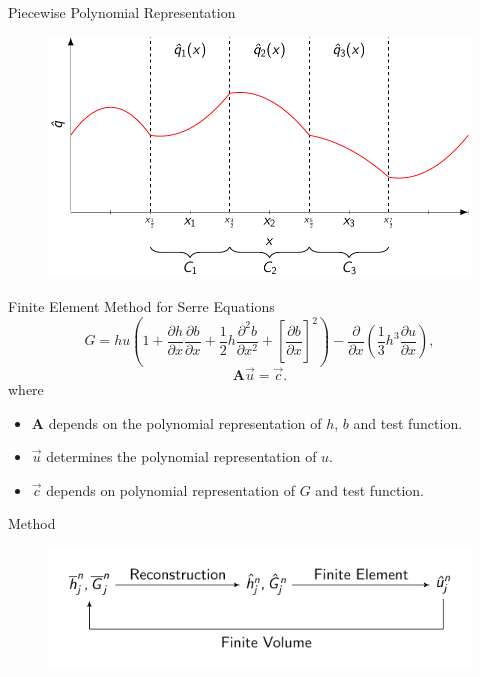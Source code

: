 \documentclass[]{beamer}
\begin{document}
\begin{frame}{Piecewise Polynomial Representation}
	\begin{figure}
		\includegraphics[width=\textwidth]{./Pics/PolyRep/P2.pdf}
	\end{figure}
\end{frame}


\begin{frame}{Finite Element Method for Serre Equations}
		\[ G =  h {u} \left(1 + \frac{\partial h}{\partial x}\frac{\partial b}{\partial x} + \frac{1}{2}h\frac{\partial^2 b}{\partial x^2} + \left[\frac{\partial b}{\partial x}\right]^2 \right) - \frac{\partial}{\partial x}\left(\frac{1}{3}h^3  \frac{\partial {u}}{\partial x}\right),\]
	\pause
	\begin{equation*}
	\boldsymbol{A} \vec{u} = \vec{c}.
	\end{equation*}
	where 
	\begin{itemize}
		\item $\boldsymbol{A}$ depends on the polynomial representation of $h$, $b$ and test function.
		\item $\vec{u}$ determines the polynomial representation of $u$.
		\item $\vec{c}$ depends on polynomial representation of $G$ and test function.
	\end{itemize}
\end{frame}


\begin{frame}{Method}
		\begin{figure}
			\includegraphics[width=\textwidth]{./Pics/ModelDiagrams/FlowChartNoBox.pdf}
		\end{figure}
\end{frame}
\end{document}
